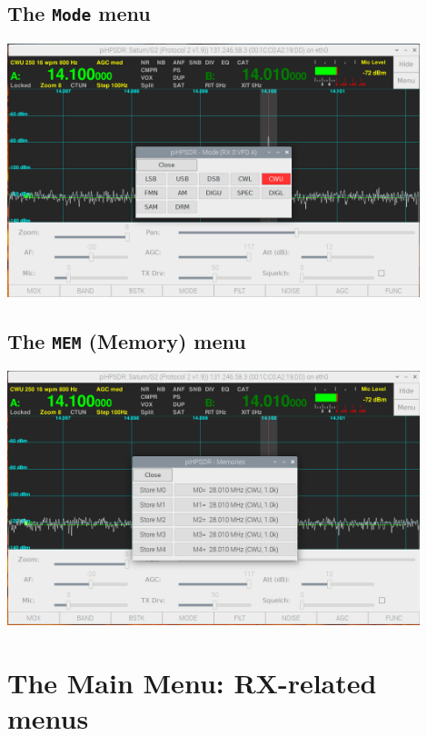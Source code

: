 \documentclass[12pt]{book}
\begin{document}
\section{The \texttt{Mode} menu}
\begin{center}
\includegraphics[width=12cm]{ModeMenu.png}
\end{center}

\section{The \texttt{MEM} (Memory) menu}
\begin{center}
\includegraphics[width=12cm]{MemMenu.png}
\end{center}
 
\chapter{The Main Menu: RX-related menus}
\end{document}
